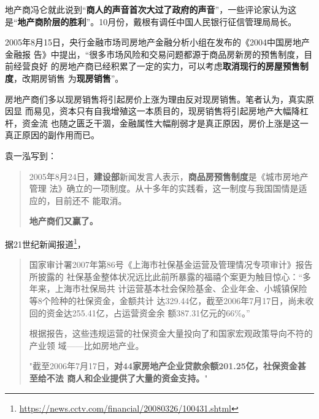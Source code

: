 地产商冯仑就此说到“\textbf{商人的声音首次大过了政府的声音}”，一些评论家认为这
是“\textbf{地产商阶层的胜利}”。10月份，戴根有调任中国人民银行征信管理局局长。






2005年8月15日，央行金融市场司房地产金融分析小组在发布的《2004中国房地产金融报
告》中提出，“很多市场风险和交易问题都源于商品房新房的预售制度，目前经营良好
的房地产商已经积累了一定的实力，可以考虑\textbf{取消现行的房屋预售制度}，改期房销售
为\textbf{现房销售}”。

房地产商们多以现房销售将引起房价上涨为理由反对现房销售。笔者认为，真实原因显
而易见，资本只有自我增殖这一本质目的，现房销售将引起房地产大幅降杠杆，资金流
也随之匮乏干涸，金融属性大幅削弱才是真正原因，房价上涨是这一真正原因的副作用而已。

袁一泓\cite{2011feiteng}写到：
\begin{quotation}
  2005年8月24日，\textbf{建设部}新闻发言人表示，\textbf{商品房预售制度}是《城市房地产管理
  法》确立的一项制度。从十多年的实践看，这一制度与我国国情是适应的，目前还不
  能取消。

  \textbf{地产商们又赢了。}
\end{quotation}



据21世纪新闻报道\footnote{\url{https://news.cctv.com/financial/20080326/100431.shtml}}，
\begin{quotation}
  国家审计署2007年第86号《上海市社保基金运营及管理情况专项审计》报告所披露的
  社保基金整体状况远比此前所暴露的福禧个案更为触目惊心：“多年来，上海市社保局共
  计运营基本社会保险基金、企业年金、小城镇保险等8个险种的社保资金，金额共计
  达329.44亿，截至2006年7月17日，尚未收回的资金达255.41亿，占运营资金余
  额387.31亿元的66\%。”

  根据报告，这些违规运营的社保资金大量投向了和国家宏观政策导向不符的产业领
  域——比如房地产业。

  "截至2006年7月17日，\textbf{对44家房地产企业贷款余额201.25亿，社保资金甚至给不法
    商人和企业提供了大量的资金支持。}"
\end{quotation}


